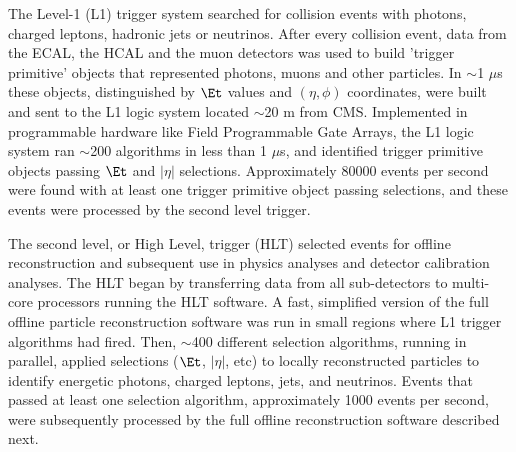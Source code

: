 The Level-1 (L1) trigger system searched for collision events with photons, charged leptons, hadronic 
jets or neutrinos.  After every collision event, data from the ECAL, the HCAL and the muon detectors was used to build 'trigger 
primitive' objects that represented photons, muons and other particles.  In $\sim$1 $\mu$s these objects, 
distinguished by $\Et$ values and $(\eta, \phi)$ coordinates, were built and sent to the L1 logic system located 
$\sim$20 m from CMS.  Implemented in programmable hardware like Field Programmable Gate Arrays, the L1 
logic system ran $\sim$200 algorithms in less than 1 $\mu$s, and identified trigger primitive objects passing $\Et$ 
and $|\eta|$ selections.  Approximately 80000 events per second were found with at least one trigger 
primitive object passing selections, and these events were processed by the second level trigger.  

The second level, or High Level, trigger (HLT) selected events for offline reconstruction and subsequent 
use in physics analyses and detector calibration analyses.  The HLT began by transferring data from all 
sub-detectors to multi-core processors running the HLT software.  
A fast, simplified version of the full offline particle reconstruction software was run in small 
regions where L1 trigger algorithms had fired.  Then, $\sim$400 different selection algorithms, running in 
parallel, applied selections ($\Et$, $|\eta|$, etc) to locally reconstructed particles 
to identify energetic photons, charged leptons, jets, and neutrinos.  Events that passed at least one selection 
algorithm, approximately 1000 events per second, were subsequently processed by the full offline reconstruction 
software described next.


